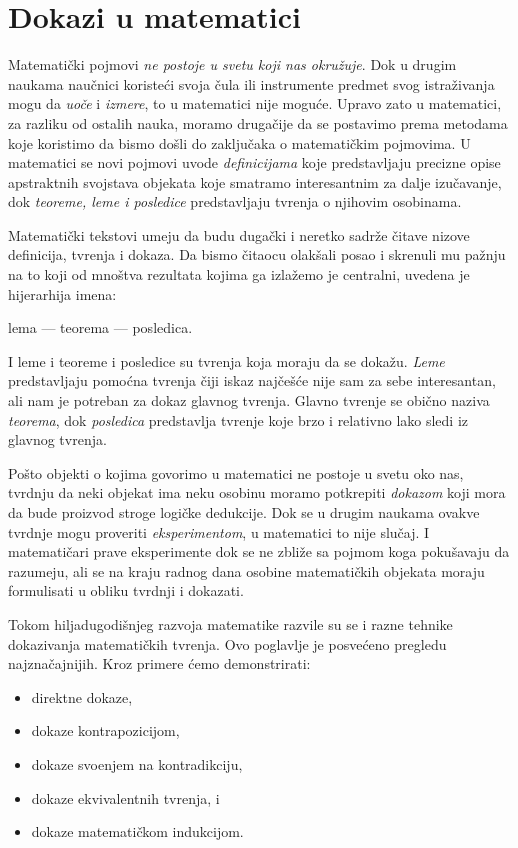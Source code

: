 \chapter{Dokazi u matematici}
\label{dokazi-u-matematici}

Matemati\v cki pojmovi \emph{ne postoje u svetu koji nas okru\v zuje}.
Dok u drugim naukama nau\v cnici koriste\'ci svoja \v cula ili instrumente
predmet svog istra\v zivanja mogu da \emph{uo\v ce} i \emph{izmere}, to u matematici nije mogu\'ce. 
Upravo zato u matematici, za razliku od ostalih nauka, moramo druga\v cije da se postavimo prema
metodama koje koristimo da bismo do\v sli do zaklju\v caka o matemati\v ckim pojmovima.
U matematici se novi pojmovi uvode \emph{definicijama} koje predstavljaju precizne opise apstraktnih
svojstava objekata koje smatramo interesantnim za dalje izu\v cavanje,
dok \emph{teoreme, leme i posledice} predstavljaju tvr\dj enja o njihovim osobinama.

Matemati\v cki tekstovi umeju da budu duga\v cki i neretko sadr\v ze \v citave nizove definicija, tvr\dj enja i dokaza.
Da bismo \v citaocu olak\v sali posao i skrenuli mu pa\v znju na to koji od mno\v stva rezultata kojima ga izla\v zemo je
centralni, uvedena je hijerarhija imena:
\begin{center}
  lema --- teorema --- posledica.
\end{center}
I leme i teoreme i posledice su tvr\dj enja koja moraju da se doka\v zu. \emph{Leme} predstavljaju pomo\'cna tvr\dj enja
\v ciji iskaz naj\v ce\v s\'ce nije sam za sebe interesantan, ali nam je potreban za dokaz glavnog tvr\dj enja.
Glavno tvr\dj enje se obi\v cno naziva \emph{teorema}, dok \emph{posledica} predstavlja tvr\dj enje koje brzo i relativno lako
sledi iz glavnog tvr\dj enja.

Po\v sto objekti o kojima govorimo u matematici ne postoje u svetu oko nas, tvrdnju da neki objekat ima
neku osobinu moramo potkrepiti \emph{dokazom} koji mora da bude proizvod stroge logi\v cke dedukcije.
Dok se u drugim naukama ovakve tvrdnje mogu proveriti \emph{eksperimentom}, u matematici to nije slu\v caj.
I matemati\v cari prave eksperimente dok se ne zbli\v ze sa pojmom koga poku\v savaju da razumeju, ali
se na kraju radnog dana osobine matemati\v ckih objekata moraju formulisati u obliku tvrdnji i dokazati.


Tokom hiljadugodi\v snjeg razvoja matematike razvile su se i razne tehnike dokazivanja matemati\v ckih tvr\dj enja.
Ovo poglavlje je posve\'ceno pregledu najzna\v cajnijih. Kroz primere \'cemo demonstrirati:
\begin{itemize}\itemsep -1pt
\item direktne dokaze,
\item dokaze kontrapozicijom,
\item dokaze svo\dj enjem na kontradikciju,
\item dokaze ekvivalentnih tvr\dj enja, i
\item dokaze matemati\v ckom indukcijom.
\end{itemize}

